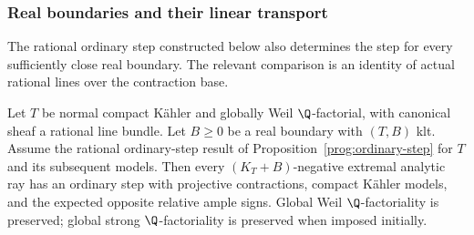 \subsubsection{Real boundaries and their linear transport}

The rational ordinary step constructed below also determines the step
for every sufficiently close real boundary. The relevant comparison is
an identity of actual rational lines over the contraction base.

\begin{proposition}
\label{prog:ordinary-replacement}
Let $T$ be normal compact K\"ahler and globally Weil $\Q$-factorial,
with canonical sheaf a rational line bundle. Let $B\geq0$ be a real
boundary with $(T,B)$ klt. Assume the rational ordinary-step result
of Proposition~\ref{prog:ordinary-step} for $T$ and its subsequent models. Then every
$(K_T+B)$-negative extremal analytic ray has an ordinary step with
projective contractions, compact K\"ahler models, and the expected
opposite relative ample signs. Global Weil $\Q$-factoriality is preserved;
global strong $\Q$-factoriality is preserved when imposed initially.
\end{proposition}
